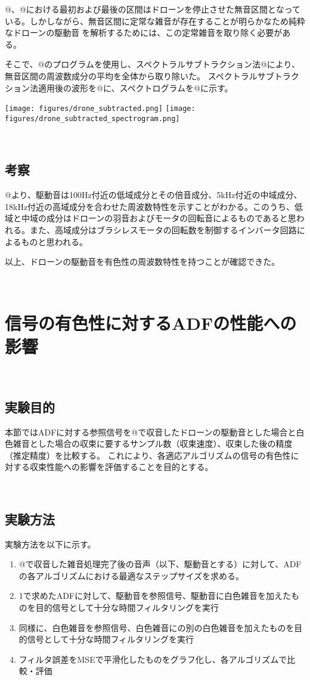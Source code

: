 @、@における最初および最後の区間はドローンを停止させた無音区間となっている。しかしながら、無音区間に定常な雑音が存在することが明らかなため純粋なドローンの駆動音を解析するためには、この定常雑音を取り除く必要がある。

そこで、@のプログラムを使用し、スペクトラルサブトラクション法@により、無音区間の周波数成分の平均を全体から取り除いた。
スペクトラルサブトラクション法適用後の波形を@に、スペクトログラムを@に示す。

\texttt{[image: figures/drone\_subtracted.png]}
\texttt{[image: figures/drone\_subtracted\_spectrogram.png]}

\
\subsection{考察}\label{ux8003ux5bdf}

@より、駆動音は100Hz付近の低域成分とその倍音成分、5kHz付近の中域成分、18kHz付近の高域成分を合わせた周波数特性を示すことがわかる。このうち、低域と中域の成分はドローンの羽音およびモータの回転音によるものであると思われる。また、高域成分はブラシレスモータの回転数を制御するインバータ回路によるものと思われる。

以上、ドローンの駆動音を有色性の周波数特性を持つことが確認できた。

\
\section{信号の有色性に対するADFの性能への影響}\label{ux4fe1ux53f7ux306eux6709ux8272ux6027ux306bux5bfeux3059ux308badfux306eux6027ux80fdux3078ux306eux5f71ux97ff}

\
\subsection{実験目的}\label{ux5b9fux9a13ux76eeux7684-1}

本節ではADFに対する参照信号を@で収音したドローンの駆動音とした場合と白色雑音とした場合の収束に要するサンプル数（収束速度）、収束した後の精度（推定精度）を比較する。
これにより、各適応アルゴリズムの信号の有色性に対する収束性能への影響を評価することを目的とする。

\
\subsection{実験方法}\label{ux5b9fux9a13ux65b9ux6cd5-1}

実験方法を以下に示す。

\begin{enumerate}
\def\labelenumi{\arabic{enumi}.}
\tightlist
\item
  @で収音した雑音処理完了後の音声（以下、駆動音とする）に対して、ADFの各アルゴリズムにおける最適なステップサイズを求める。
\item
  1で求めたADFに対して、駆動音を参照信号、駆動音に白色雑音を加えたものを目的信号として十分な時間フィルタリングを実行
\item
  同様に、白色雑音を参照信号、白色雑音にの別の白色雑音を加えたものを目的信号として十分な時間フィルタリングを実行
\item
  フィルタ誤差をMSEで平滑化したものをグラフ化し、各アルゴリズムで比較・評価
\end{enumerate}

